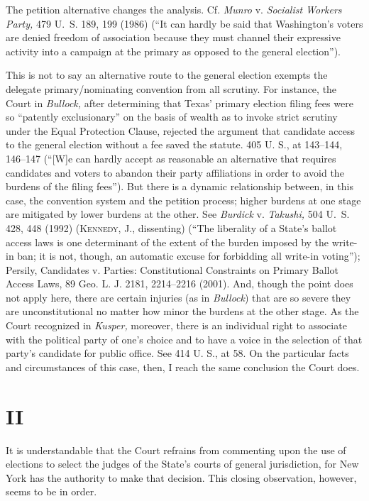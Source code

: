  The petition alternative changes the analysis. Cf. \emph{Munro} v. \emph{Socialist Workers Party,} 479 U.~S. 189, 199 (1986) (``It can hardly be said that Washington's voters are denied freedom of association because they must channel their expressive activity into a campaign at the primary as opposed to the general election'').

  This is not to say an alternative route to the general election exempts the delegate primary/nominating convention from all scrutiny. For instance, the Court in \emph{Bullock,} after determining that Texas' primary election filing fees were so ``patently exclusionary'' on the basis of wealth as to invoke strict scrutiny under the Equal Protection Clause, rejected the argument that candidate access to the general election without a fee saved the statute. 405 U. S., at 143--144, 146--147 (``[W]e can hardly accept as reasonable an alternative that requires candidates and voters to abandon their party affiliations in order to avoid the burdens of the filing fees''). But there is a dynamic relationship between, in this case, the convention system and the petition process; higher burdens at one stage are mitigated by lower burdens at the other. See \emph{Burdick} v. \emph{Takushi,} 504 U.~S. 428, 448 (1992) (\textsc{Kennedy,} J., dissenting) (``The liberality of a State's ballot access laws is one determinant of the extent of the burden imposed by the write-in ban; it is not, though, an automatic excuse for forbidding all write-in voting''); Persily, Candidates v. Parties: Constitutional Constraints on Primary Ballot Access Laws, 89 Geo. L. J. 2181, 2214--2216 (2001). And, though the point does not apply here, there are certain injuries (as in \emph{Bullock}) that are so severe they are unconstitutional no matter how minor the burdens at the other stage. As the Court recognized in \emph{Kusper,} moreover, there is an individual right to associate with the political party of one's choice and to have a voice in the selection of that party's candidate for public office. See 414 U. S., at 58. On the particular facts and circumstances of this case, then, I reach the same conclusion the Court does. \newpage 

\section{II}

  It is understandable that the Court refrains from commenting upon the use of elections to select the judges of the State's courts of general jurisdiction, for New York has the authority to make that decision. This closing observation, however, seems to be in order.

